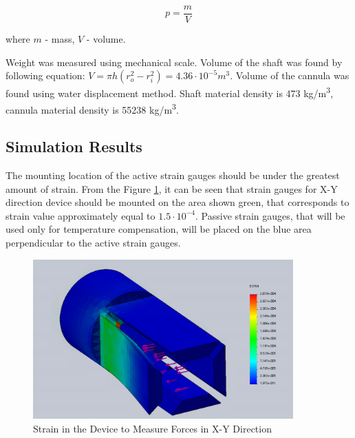 \begin{equation}
p=\frac{m}{V}
\end{equation}

where $m$ - mass, $V$ - volume.

Weight was measured using mechanical scale. Volume of the shaft was found by following equation: $V =  \pi h(r_o^2-r_i^2) = 4.36 \cdot 10^{-5} m^3$. Volume of the cannula was found using water displacement method. Shaft material density is 473 kg/m\textsuperscript{3}, cannula material density is 55238 kg/m\textsuperscript{3}.

\subsection{Simulation Results}
\label{sec:FEAres}
The mounting location of the active strain gauges should be under the greatest amount of strain. From the Figure \ref{fig:XYdev}, it can be seen that strain gauges for X-Y direction device should be mounted on the area shown green, that corresponds to strain value approximately equal to $1.5 \cdot 10^{-4}$. Passive strain gauges, that will be used only for temperature compensation, will be placed on the blue area perpendicular to the active strain gauges.

\begin{figure}[h]
	\begin{center}
		\includegraphics[width=100mm]{fig/methods/old_sleeve.png}
	\end{center}
	\vspace{-4mm}
	\caption[X-Y device]
	{Strain in the Device to Measure Forces in X-Y Direction}
	\label{fig:XYdev}
	\vspace{-2mm}
\end{figure}


